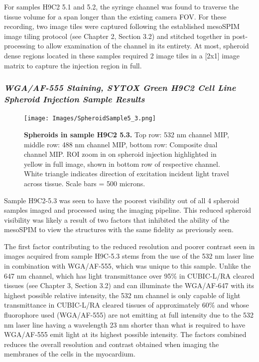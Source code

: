 For samples H9C2 5.1 and 5.2, the syringe channel was found to traverse the tissue volume for a span longer than the existing camera FOV. For these recording, two image tiles were captured following the established mesoSPIM image tiling protocol (see Chapter 2, Section 3.2) and stitched together in post-processing to allow examination of the channel in its entirety. At most, spheroid dense regions located in these samples required 2 image tiles in a [2x1] image matrix to capture the injection region in full.

\subsubsection{\textit{WGA/AF-555 Staining, SYTOX Green H9C2 Cell Line Spheroid Injection Sample Results}}

\begin{figure}[H]
\centering
\texttt{[image: Images/SpheroidSample5\_3.png]}
\caption{\textbf{Spheroids in sample H9C2 5.3.} Top row: 532 nm channel MIP, middle row: 488 nm channel MIP, bottom row: Composite dual channel MIP. ROI zoom in on spheroid injection highlighted in yellow in full image, shown in bottom row of respective channel. White triangle indicates direction of excitation incident light travel across tissue. Scale bars = 500 microns.}
\label{fig:enter-label}
\end{figure}
\medskip

Sample H9C2-5.3 was seen to have the poorest visibility out of all 4 spheroid samples imaged and processed using the imaging pipeline. This reduced spheroid visibility was likely a result of two factors that inhibited the ability of the mesoSPIM to view the structures with the same fidelity as previously seen. 

The first factor contributing to the reduced resolution and poorer contrast seen in images acquired from sample H9C-5.3 stems from the use of the 532 nm laser line in combination with WGA/AF-555, which was unique to this sample. Unlike the 647 nm channel, which has light transmittance over 95\% in CUBIC-L/RA cleared tissues (see Chapter 3, Section 3.2) and can illuminate the WGA/AF-647 with its highest possible relative intensity, the 532 nm channel is only capable of light transmittance in CUBIC-L/RA cleared tissues of approximately 60\% and whose fluorophore used (WGA/AF-555) are not emitting at full intensity due to the 532 nm laser line having a wavelength 23 nm shorter than what is required to have WGA/AF-555 emit light at its highest possible intensity. The factors combined reduces the overall resolution and contrast obtained when imaging the membranes of the cells in the myocardium. 	 

